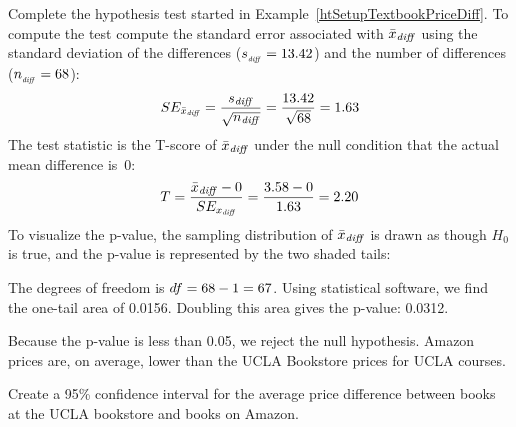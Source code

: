 \begin{examplewrap}
\begin{nexample}{Complete the hypothesis test started
    in Example~\ref{htSetupTextbookPriceDiff}.}
  \label{SEAndTScoreTextbookPriceDiff}
  To compute the test  compute the standard error associated with
  $\bar{x}_{\text{\emph{diff}}}$ using the standard
  deviation of the differences
  ($s_{_{\text{\emph{diff}}}} = 13.42{}$)
  and the number of differences
  ($n_{_{\text{\emph{diff}}}} = 68{}$):
  \begin{align*}
  SE_{\bar{x}_{\text{\emph{diff}}}}
    = \frac{s_{\text{\emph{diff}}}}{\sqrt{n_{\text{\emph{diff}}}}}
    = \frac{13.42{}}{\sqrt{68{}}} = 1.63{}
  \end{align*}
  The test statistic is the T-score of
  $\bar{x}_{\text{\emph{diff}}}$
  under the null condition that the actual mean
  difference is~0:
  \begin{align*}
  T
    = \frac{\bar{x}_{\text{\emph{diff}}} - 0}
        {SE_{x_{\text{\emph{diff}}}}}
    = \frac{3.58{} - 0}{1.63{}} = 2.20
  \end{align*}
  To visualize the p-value, the sampling distribution
  of $\bar{x}_{\text{\emph{diff}}}$ is drawn as though
  $H_0$ is true,
  and the p-value is represented by the two shaded tails:
  \begin{center}
  \end{center}
  The degrees of freedom is
  $df = 68{} - 1 = 67{}$.
  Using statistical software, we find the
  one-tail area of 0.0156.
  Doubling this area gives the p-value: 0.0312.

  Because the p-value is less than 0.05,
  we reject the null hypothesis.
  Amazon prices are, on average, lower than the
  UCLA Bookstore prices for UCLA courses.
\end{nexample}
\end{examplewrap}

\D{\newpage}

\begin{exercisewrap}
\begin{nexercise}
Create a 95\% confidence interval for the average
price difference between books at the UCLA bookstore
and books on Amazon.\footnotemark{}
\end{nexercise}
\end{exercisewrap}

